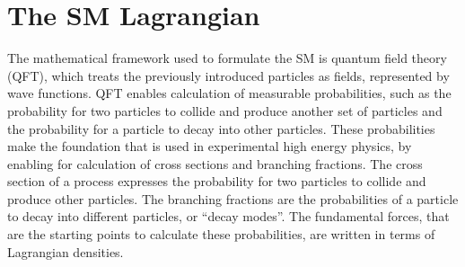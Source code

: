 \section{The SM Lagrangian}
\noindent\justify
The mathematical framework used to formulate the SM is quantum field theory (QFT), which treats the previously introduced particles as fields, represented by wave functions. 
QFT enables calculation of measurable probabilities, such as the probability for two particles to collide and produce another set of particles and the probability for a particle to decay into other particles. 
These probabilities make the foundation that is used in experimental high energy physics, by enabling for calculation of cross sections and branching fractions. 
The cross section of a process expresses the probability for two particles to collide and produce other particles. 
The branching fractions are the probabilities of a particle to decay into different particles, or ``decay modes''. 
The fundamental forces, that are the starting points to calculate these probabilities, are written in terms of Lagrangian densities. 
